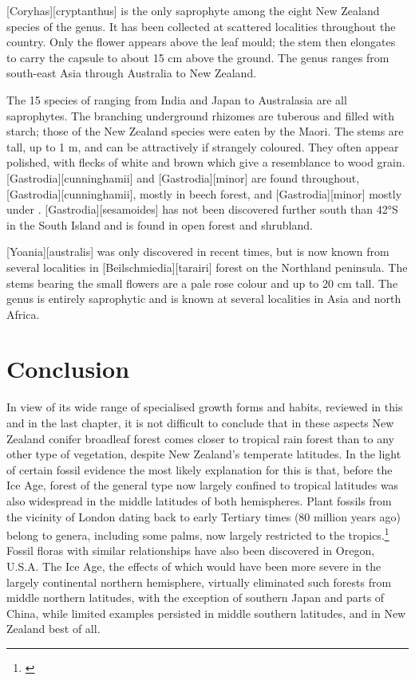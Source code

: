 [Coryhas][cryptanthus] is the only saprophyte among the eight New Zealand species of the genus.
It has been collected at scattered localities throughout the country.
Only the flower appears above the leaf mould; the stem then elongates to carry the capsule to about 15 cm above the ground.
The genus ranges from south-east Asia through Australia to New Zealand.

The 15 species of  ranging from India and Japan to Australasia are all saprophytes.
The branching underground rhizomes are tuberous and filled with starch; those of the New Zealand species were eaten by the Maori.
The stems are tall, up to 1 m, and can be attractively if strangely coloured.
They often appear polished, with flecks of white and brown which give a resemblance to wood grain. [Gastrodia][cunninghamii] and [Gastrodia][minor] are found throughout, [Gastrodia][cunninghamii], mostly in beech forest, and [Gastrodia][minor] mostly under . [Gastrodia][sesamoides] has not been discovered further south than 42°S in the South Island and is found in open forest and shrubland.

[Yoania][australis] was only discovered in recent times, but is now known from several localities in [Beilschmiedia][tarairi] forest on the Northland peninsula.
The stems bearing the small flowers are a pale rose colour and up to 20 cm tall.
The genus is entirely saprophytic and is known at several localities in Asia and north Africa.

\section{Conclusion}

In view of its wide range of specialised growth forms and habits, reviewed in this and in the last chapter, it is not difficult to conclude that in these aspects New Zealand conifer broadleaf forest comes closer to tropical rain forest than to any other type of vegetation, despite New Zealand's temperate latitudes.
In the light of certain fossil evidence the most likely explanation for this is that, before the Ice Age, forest of the general type now largely confined to tropical latitudes was also widespread in the middle latitudes of both hemispheres.
Plant fossils from the vicinity of London dating back to early Tertiary times (80 million years ago) belong to genera, including some palms, now largely restricted to the tropics.\footnote{\cite{chandler1964lower}}
Fossil floras with similar relationships have also been discovered in Oregon, U.S.A.
The Ice Age, the effects of which would have been more severe in the largely continental northern hemisphere, virtually eliminated such forests from middle northern latitudes, with the exception of southern Japan and parts of China, while limited examples persisted in middle southern latitudes, and in New Zealand best of all.

